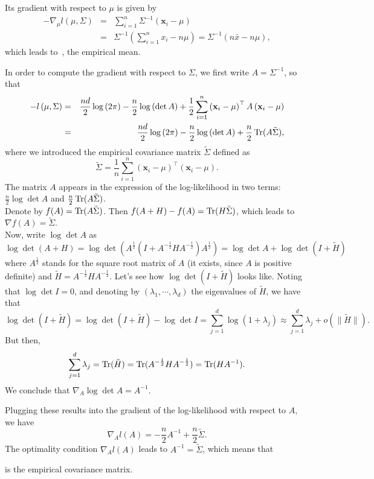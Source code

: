 \documentclass[12pt]{report}	%
\def\ts{\top}
\def\xb{\mathbf{x}}
\begin{document}
Its gradient with respect to $\mu$ is given by
\begin{eqnarray*}
-\nabla_{\mu}l\left(\mu,\Sigma\right) & = & \sum_{i=1}^{n}\Sigma^{-1}\left(\xb_{i}-\mu\right)\\
 & = & \Sigma^{-1}\left(\sum_{i=1}^{n}x_{i}-n\mu\right) = \Sigma^{-1}\left(n\bar{x}-n\mu\right),
 \end{eqnarray*}
 which leads to \,, the empirical mean.
 
 In order to compute the gradient with respect to $\Sigma$, we first write $A=\Sigma^{-1}$, so that
\begin{eqnarray*}
-l\left(\mu,\Sigma\right) & = & \frac{nd}{2}\log\left(2\pi\right)-\frac{n}{2}\log\left(\det A\right)+\frac{1}{2}\sum_{i=1}^{n}\left(\xb_{i}-\mu\right)^{\ts}A\left(\xb_{i}-\mu\right)\\
&=&\frac{nd}{2}\log\left(2\pi\right)-\frac{n}{2}\log\left(\det A\right)+\frac{n}{2}\tr(A\tilde{\Sigma}),
 \end{eqnarray*}
where we introduced the empirical covariance matrix $\tilde{\Sigma}$ defined as
\[
\tilde{\Sigma} = \frac{1}{n}\sum_{i=1}^n\left(\xb_{i}-\mu\right)^{\ts}\left(\xb_{i}-\mu\right).
 \]
 The matrix $A$ appears in the expression of the log-likelihood in two terms: $\frac{n}{2}\log\det A$ and $\frac{n}{2}\operatorname{Tr}(A\tilde{\Sigma})$.\\
 Denote by $f(A) = \operatorname{Tr}(A\tilde{\Sigma})$. Then
 $f(A+H)-f(A) = \operatorname{Tr}(H\tilde{\Sigma})$,
 which leads to $\nabla f (A) = \tilde{\Sigma}$.\\ 
 Now, write $\log\det A$ as
 \[
 \log\det (A+H) =  \log\det \left( A^\frac{1}{2}\left(I+A^{-\frac{1}{2}}HA^{-\frac{1}{2}}\right)A^\frac{1}{2} \right) = \log\det A + \log\det (I+\tilde{H})
 \]
 where $A^\frac{1}{2}$ stands for the square root matrix of $A$ (it exists, since $A$ is positive definite) and $\tilde{H} = A^{-\frac{1}{2}}HA^{-\frac{1}{2}}$. Let's see how $\log\det (I+\tilde{H})$ looks like. Noting that $\log\det I = 0$, and denoting by $(\lambda_1,\cdots ,\lambda_d)$ the eigenvalues of $\tilde{H}$, we have that
 \[
\log\det (I+\tilde{H}) = \log\det (I+\tilde{H})-\log\det I = \sum_{j=1}^d\log(1+\lambda_j) \approx \sum_{j=1}^d\lambda_j + o(\lVert \tilde{H} \rVert).
 \]
 But then,$$\sum_{j=1}^d\lambda_j = \operatorname{Tr}(\tilde{H}) = \operatorname{Tr}(A^{-\frac{1}{2}}HA^{-\frac{1}{2}}) = \operatorname{Tr}(HA^{-1}).$$We conclude that $\nabla_A \log\det A = A^{-1}$.
 
 Plugging these results into the gradient of the log-likelihood with respect to $A$, we have
 \[
 \nabla_A l(A) = -\frac{n}{2}A^{-1}+\frac{n}{2}\tilde{\Sigma}.
 \]
 The optimality condition $\nabla_A l(A)$ leads to $A^{-1} = \tilde{\Sigma}$, which means that\begin{center}\fbox{$\hat{\Sigma} = \frac{1}{n}\sum_{i=1}^n\left(\xb_{i}-\mu\right)^{\ts}\left(\xb_{i}-\mu\right)$}\end{center} is the empirical covariance matrix.
 
\end{document}
